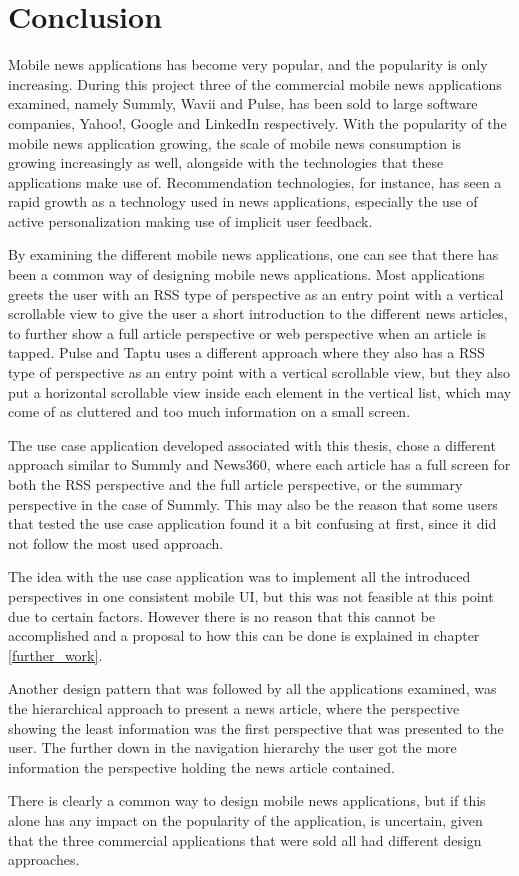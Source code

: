 \chapter{Conclusion}
\label{chapter_conclusion}

Mobile news applications has become very popular, and the popularity is only increasing. During this project three of the commercial mobile news applications examined, namely Summly, Wavii and Pulse, has been sold to large software companies, Yahoo!, Google and LinkedIn respectively. With the popularity of the mobile news application growing, the scale of mobile news consumption is growing increasingly as well, alongside with the technologies that these applications make use of. Recommendation technologies, for instance, has seen a rapid growth as a technology used in news applications, especially the use of active personalization making use of implicit user feedback. 

By examining the different mobile news applications, one can see that there has been a common way of designing mobile news applications. Most applications greets the user with an RSS type of perspective as an entry point with a vertical scrollable view to give the user a short introduction to the different news articles, to further show a full article perspective or web perspective when an article is tapped. Pulse and Taptu uses a different approach where they also has a RSS type of perspective as an entry point with a vertical scrollable view, but they also put a horizontal scrollable view inside each element in the vertical list, which may come of as cluttered and too much information on a small screen.

The use case application developed associated with this thesis, chose a different approach similar to Summly and News360, where each article has a full screen for both the RSS perspective and the full article perspective, or the summary perspective in the case of Summly. This may also be the reason that some users that tested the use case application found it a bit confusing at first, since it did not follow the most used approach.

The idea with the use case application was to implement all the introduced perspectives in one consistent mobile UI, but this was not feasible at this point due to certain factors. However there is no reason that this cannot be accomplished and a proposal to how this can be done is explained in chapter \ref{further_work}.

Another design pattern that was followed by all the applications examined, was the hierarchical approach to present a news article, where the perspective showing the least information was the first perspective that was presented to the user. The further down in the navigation hierarchy the user got the more information the perspective holding the news article contained.

There is clearly a common way to design mobile news applications, but if this alone has any impact on the popularity of the application, is uncertain, given that the three commercial applications that were sold all had different design approaches.